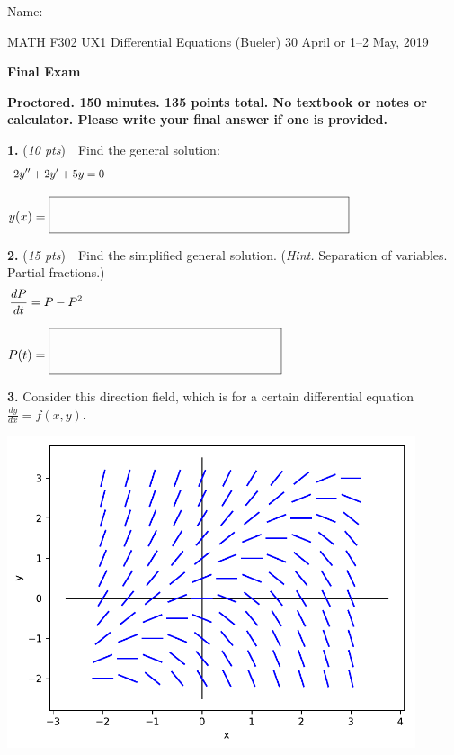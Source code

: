 \documentclass[11pt,reqno]{amsart}
\newcommand{\prob}[1]{\bigskip\noindent\textbf{#1.} }
\newcommand{\pts}[1]{(\emph{#1 pts})}
\newcommand{\probpts}[2]{\prob{#1} \pts{#2} \,\,}
\begin{document}
\hfill \Large Name:\underline{\phantom{Ed Bueler really really long long long name}}
\medskip

\scriptsize \noindent MATH F302 UX1 Differential Equations (Bueler) \hfill 30 April or 1--2 May, 2019
\medskip

\Large\centerline{\textbf{Final Exam}}

\medskip
\large
\begin{center}
\textbf{Proctored.  150 minutes.  135 points total.  No textbook or notes or calculator.  Please write your final answer  if one is provided.}
\end{center}

\medskip
\thispagestyle{empty}
\normalsize

\probpts{1}{10}  Find the general solution:
    $$2 y'' + 2 y' + 5 y = 0 \hspace{110mm}$$
\vspace{2.0in}

\hfill $y(x) = \fbox{\LARGE \strut \hspace{80mm} \strut}$

\probpts{2}{15}  Find the simplified general solution.  (\emph{Hint.}  Separation of variables.  Partial fractions.)
    $$\frac{dP}{dt} = P - P^2 \hspace{110mm}$$
\vfill

\hfill $P(t) = \fbox{\Huge \strut \hspace{60mm} \strut}$

\newpage
\prob{3}  Consider this direction field, which is for a certain differential equation $\displaystyle \frac{dy}{dx} = f(x,y)$.

\begin{center}
\includegraphics[width=0.9\textwidth]{figs/yminusx-dirfield}
\end{center}
\end{document}
